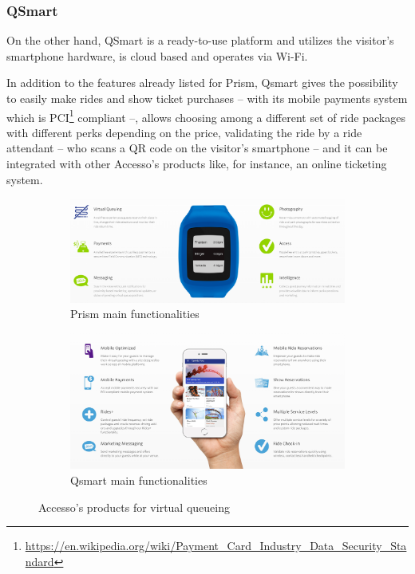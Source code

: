 \subsubsection*{QSmart}
On the other hand, QSmart is a ready-to-use platform and utilizes the visitor's smartphone hardware, is cloud based
and operates via Wi-Fi.

In addition to the features already listed for Prism, Qsmart gives the possibility to easily make rides and
show ticket purchases -- with its mobile payments system which is
PCI\footnote{\url{https://en.wikipedia.org/wiki/Payment_Card_Industry_Data_Security_Standard}} compliant --,
allows choosing among a different set of ride packages with different perks depending on the price, validating the
ride by a ride attendant -- who scans a QR code on the visitor's smartphone -- and it can be integrated with other Accesso's products like, for instance, an online ticketing system.


\begin{figure}[H]
	\centering
	\begin{subfigure}[b]{0.85\textwidth}
		\centering
		\includegraphics[width=\textwidth]{img/prism}
		\caption{Prism main functionalities}
		\label{fig:prism}
	\end{subfigure}
	\hfill
	\begin{subfigure}[b]{0.85\textwidth}
		\centering
		\includegraphics[width=\textwidth]{img/qsmart}
		\caption{Qsmart main functionalities}
		\label{fig:qsmart}
	\end{subfigure}
	\caption{Accesso's products for virtual queueing\protect\footnotemark}
	\label{fig:prismart}
\end{figure}

